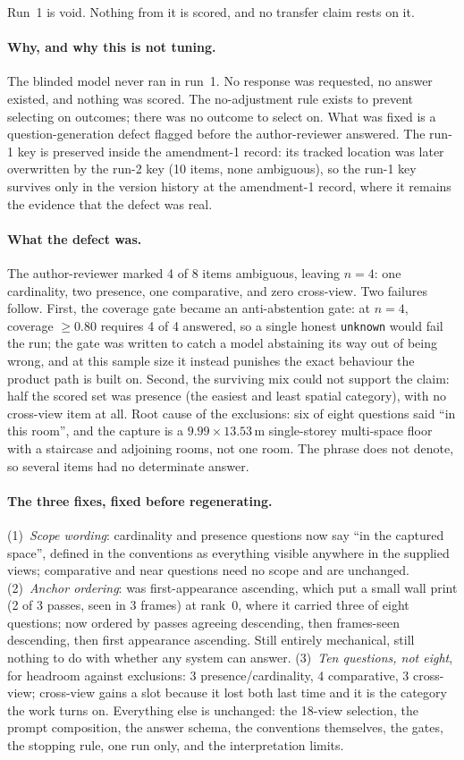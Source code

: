 Run~1 is void. Nothing from it is scored, and no transfer claim rests on it.

\paragraph{Why, and why this is not tuning.} The blinded model never ran in
run~1. No response was requested, no answer existed, and nothing was scored.
The no-adjustment rule exists to prevent selecting on outcomes; there was no
outcome to select on. What was fixed is a question-generation defect flagged
before the author-reviewer answered. The run-1 key is preserved inside the
amendment-1 record: its tracked location was later overwritten by the run-2
key (10 items, none ambiguous), so the run-1 key survives only in the
version history at the amendment-1 record, where it remains the evidence
that the defect was real.

\paragraph{What the defect was.} The author-reviewer marked 4 of 8 items ambiguous,
leaving $n = 4$: one cardinality, two presence, one comparative, and zero
cross-view. Two failures follow. First, the coverage gate became an
anti-abstention gate: at $n = 4$, coverage $\ge 0.80$ requires 4 of 4
answered, so a single honest \texttt{unknown} would fail the run; the
gate was written to catch a model abstaining its way out of being wrong,
and at this sample size it instead punishes the exact behaviour the product
path is built on. Second, the surviving mix could not support the claim:
half the scored set was presence (the easiest and least spatial category),
with no cross-view item at all. Root cause of the exclusions: six of
eight questions said ``in this room'', and the capture is a
$9.99 \times 13.53$\,m single-storey multi-space floor with a staircase and
adjoining rooms, not one room. The phrase does not denote, so several items
had no determinate answer.

\paragraph{The three fixes, fixed before regenerating.}
(1)~\emph{Scope wording}: cardinality and presence questions now say ``in
the captured space'', defined in the conventions as everything visible
anywhere in the supplied views; comparative and near questions need no scope
and are unchanged. (2)~\emph{Anchor ordering}: was first-appearance
ascending, which put a small wall print (2 of 3 passes, seen in 3 frames)
at rank~0, where it carried three of eight questions; now ordered by
passes agreeing descending, then frames-seen descending, then first
appearance ascending. Still entirely mechanical, still nothing to do with
whether any system can answer. (3)~\emph{Ten questions, not eight}, for
headroom against exclusions: 3 presence/cardinality, 4 comparative, 3
cross-view; cross-view gains a slot because it lost both last time and it is
the category the work turns on. Everything else is unchanged: the 18-view
selection, the prompt composition, the answer schema, the conventions
themselves, the gates, the stopping rule, one run only, and the
interpretation limits.

